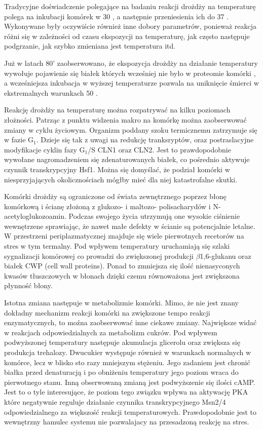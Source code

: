 \documentclass{pracamgr}
\begin{document}
Tradycyjne doświadczenie polegające na badaniu reakcji drożdży na temperaturę polega na inkubacji komórek w 30 \textcelsius, a
następnie przeniesienia ich do 37 \textcelsius. Wykonywane były oczywiście również inne dobory parametrów, ponieważ 
reakcja różni się w zależności od czasu ekspozycji na temperaturę, jak często następuje podgrzanie, jak szybko zmieniana
jest temperatura itd.

Już w latach 80' zaobserwowano, że ekspozycja drożdży na działanie temperatury wywołuje pojawienie się białek których 
wcześniej nie było w proteomie komórki \cite{Miller1979}, a wcześniejsza inkubacja w wyższej temperaturze pozwala 
na uniknięcie śmierci w ekstremalnych warunkach 50 \textcelsius \cite{Mcalister1980}.

Reakcję drożdży na temperaturę można rozpatrywać na kilku poziomach złożności. Patrząc z punktu widzenia makro na komórkę
można zaobserwować zmiany w cyklu życiowym. Organizm poddany szoku termicznemu zatrzymuje się w fazie G$_1$. Dzieje się tak 
z uwagi na redukcję tranksryptów, oraz postraslacyjne modyfikacje cyklin fazy G$_1$/S CLN1 oraz CLN2\cite{CyclinArrest}. Jest to prawdopodobnie
wywołane nagromadzeniem się zdenaturowanych białek, co pośrednio aktywuje czynnik transkrypcyjny Hsf1\cite{MisfoldedProteins}. Można się domyślać, że 
podział komórki w niesprzyjających okolicznościach mógłby mieć dla niej katastrofalne skutki.	

Komórki drożdży są ograniczone od świata zewnętrznego poprzez błonę komórkową i ścianę złożoną z glukozo- i maltozo- polisacharydów
 i N-acetyloglukozoamin. Podczas swojego życia utrzymują one wysokie ciśnienie wewnętrzene sprawiając, że nawet małe defekty w ścianie 
 są potencjalnie letalne. W przestrzeni periplazmatycznej znajduje się wiele pierwotnych recetorów na stres w tym termalny. 
 Pod wpływem temperatury uruchamiają się szlaki sygnalizacji komórowej co prowadzi do zwiększonej produkcji $\beta$1,6-glukanu
 oraz białek CWP (cell wall proteins)\cite{CellWall}. Ponad to zmniejsza się ilość nienasyconych kwasów tłuszczowych w błonach \cite{CellLipids}
 dzięki czemu równoważona jest zwiększona płynność błony.
 
 Istotna zmiana następuje w metabolizmie komórki. Mimo, że nie jest znany dokładny mechanizm reakcji komórki na zwiększone 
 tempo reakcji enzymatycznych, to moźna zaobserwować inne ciekawe zmiany. Największe widać w reakcjach odpowiedzialnych za
 metabolizm cukrów. Pod wpływem podwyższonej temperatury następuje akumulacja glicerolu \cite{GlycerolAccumulate} oraz
 zwiększa się produkcja trehalozy. Dwucukier występuje również w warunkach normalnych w komórce, lecz w blisko sto razy mniejszym stężeniu. 
 Jego zadaniem jest chronić białka przed denaturacją i po obniżeniu temperatury jego poziom wraca do pierwotnego stanu. Inną obserwowaną
 zmianą jest podwyższenie się ilości cAMP. Jest to o tyle interesujące, że poziom tego związku wpływa na aktywację PKA które negatywnie
 reguluje działanie czynnika transkrypcyjnego Msn2/4 odpowiedzialnego za większość reakcji temperaturowych. Prawdopodobnie 
 jest to wewnętrzny hamulec systemu nie pozwalajacy na przesadzoną reakcję na stres\cite{Blomberg00,StressResponse99}.
\end{document}
